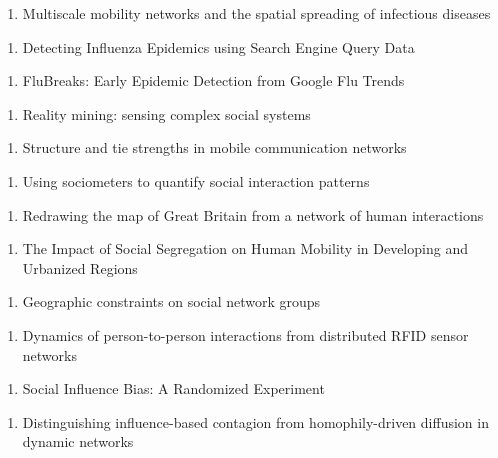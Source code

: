  \begin{enumerate}
\item Multiscale mobility networks and the spatial spreading of infectious diseases
\end{enumerate}

\begin{enumerate}
\item  Detecting Influenza Epidemics using Search Engine Query Data
\end{enumerate}

\begin{enumerate}
\item FluBreaks: Early Epidemic Detection from Google Flu Trends
\end{enumerate}
 \begin{enumerate}
\item Reality mining: sensing complex social systems
\end{enumerate}

 \begin{enumerate}
\item Structure and tie strengths in mobile communication networks
\end{enumerate}
 \begin{enumerate}
\item Using sociometers to quantify social interaction patterns
\end{enumerate}
\begin{enumerate}
\item Redrawing the map of Great Britain from a network of human interactions
\end{enumerate}
 \begin{enumerate}
\item The Impact of Social Segregation on Human Mobility in Developing and Urbanized Regions
\end{enumerate}
 \begin{enumerate}
\item Geographic constraints on social network groups
\end{enumerate}
 \begin{enumerate}
\item Dynamics of person-to-person interactions from distributed RFID sensor networks
\end{enumerate}
 \begin{enumerate}
\item Social Influence Bias: A Randomized Experiment
\end{enumerate}
 \begin{enumerate}
\item Distinguishing influence-based contagion from homophily-driven diffusion in dynamic networks
\end{enumerate}

